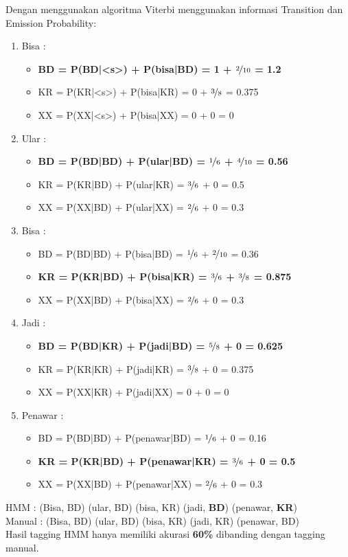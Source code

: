 \documentclass[paper=a4, fontsize=11pt]{scrartcl} %
\numberwithin{equation}{section} %
\numberwithin{figure}{section} %
\numberwithin{table}{section} %
\begin{document}
Dengan menggunakan algoritma Viterbi menggunakan informasi Transition dan Emission Probability:
\begin{enumerate}
	\item Bisa :
	\begin{itemize}
		\item \textbf{BD = P(BD|<s>) + P(bisa|BD) = 1 + $\nicefrac{2}{10}$ = 1.2}				
		\item KR = P(KR|<s>) + P(bisa|KR) = 0 + $\nicefrac{3}{8}$ = 0.375
		\item XX = P(XX|<s>) + P(bisa|XX) = 0 + 0 = 0				
	\end{itemize}
	\item Ular :
	\begin{itemize}
		\item \textbf{BD = P(BD|BD) + P(ular|BD) = $\nicefrac{1}{6}$ + $\nicefrac{4}{10}$ = 0.56}				
		\item KR = P(KR|BD) + P(ular|KR) = $\nicefrac{3}{6}$ + 0 = 0.5
		\item XX = P(XX|BD) + P(ular|XX) = $\nicefrac{2}{6}$ + 0 = 0.3				
	\end{itemize}
	\item Bisa :
	\begin{itemize}
		\item BD = P(BD|BD) + P(bisa|BD) = $\nicefrac{1}{6}$ + $\nicefrac{2}{10}$ = 0.36
		\item \textbf{KR = P(KR|BD) + P(bisa|KR) = $\nicefrac{3}{6}$ + $\nicefrac{3}{8}$ = 0.875}
		\item XX = P(XX|BD) + P(bisa|XX) = $\nicefrac{2}{6}$ + 0 = 0.3				
	\end{itemize}
	\item Jadi : 
	\begin{itemize}
		\item \textbf{BD = P(BD|KR) + P(jadi|BD) = $\nicefrac{5}{8}$ + 0 = 0.625}
		\item KR = P(KR|KR) + P(jadi|KR) = $\nicefrac{3}{8}$ + 0 = 0.375
		\item XX = P(XX|KR) + P(jadi|XX) = 0 + 0 = 0
	\end{itemize}
	\item Penawar : 
	\begin{itemize}
		\item BD = P(BD|BD) + P(penawar|BD) = $\nicefrac{1}{6}$ + 0 = 0.16
		\item \textbf{KR = P(KR|BD) + P(penawar|KR) = $\nicefrac{3}{6}$ + 0 = 0.5}
		\item XX = P(XX|BD) + P(penawar|XX) = $\nicefrac{2}{6}$ + 0 = 0.3
	\end{itemize}		
\end{enumerate}
HMM : (Bisa, BD) (ular, BD) (bisa, KR) (jadi, \textbf{BD}) (penawar, \textbf{KR}) \\
Manual : (Bisa, BD) (ular, BD) (bisa, KR) (jadi, KR) (penawar, BD) \\
Hasil tagging HMM hanya memiliki akurasi \textbf{60\%} dibanding dengan tagging manual.
\end{document}
